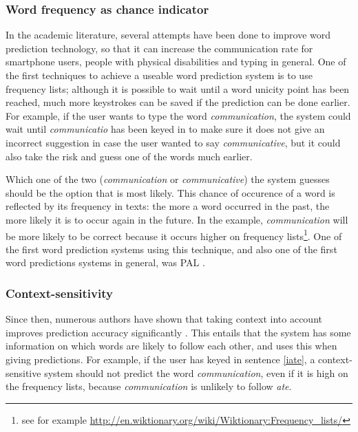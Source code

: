 \documentclass[12pt]{article}
\begin{document}
\subsubsection{Word frequency as chance indicator}

In the academic literature, several attempts have been done to improve word prediction technology, so that it can increase the communication rate for smartphone users, people with physical disabilities and typing in general. One of the first techniques to achieve a useable word prediction system is to use frequency lists; although it is possible to wait until a word unicity point has been reached, much more keystrokes can be saved if the prediction can be done earlier. For example, if the user wants to type the word \emph{communication}, the system could wait until \emph{communicatio} has been keyed in to make sure it does not give an incorrect suggestion in case the user wanted to say \emph{communicative}, but it could also take the risk and guess one of the words much earlier. 

Which one of the two (\emph{communication} or \emph{communicative}) the system guesses should be the option that is most likely. This chance of occurence of a word is reflected by its frequency in texts: the more a word occurred in the past, the more likely it is to occur again in the future. In the example, \emph{communication} will be more likely to be correct because it occurs higher on frequency lists\footnote{see for example \url{http://en.wiktionary.org/wiki/Wiktionary:Frequency\_lists/}}. One of the first word prediction systems using this technique, and also one of the first word predictions systems in general, was PAL . 

\subsubsection{Context-sensitivity} \label{context-sensitivity}

Since then, numerous authors have shown that taking context into account improves prediction accuracy significantly \cite[among others]{Lesher+99,Garay-Vitoria+06,Tanaka-Ishii07,vandenbosch+08}. This entails that the system has some information on which words are likely to follow each other, and uses this when giving predictions. For example, if the user has keyed in sentence \ref{iate}, a context-sensitive system should not predict the word \emph{communication}, even if it is high on the frequency lists, because \emph{communication} is unlikely to follow \emph{ate}.
\end{document}

